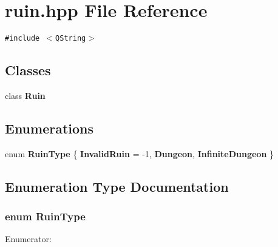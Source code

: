 \section{ruin.hpp File Reference}
\label{ruin_8hpp}
{\tt \#include $<$QString$>$}\par
\subsection*{Classes}
\begin{CompactItemize}
\item 
class {\bf Ruin}
\end{CompactItemize}
\subsection*{Enumerations}
\begin{CompactItemize}
\item 
enum {\bf Ruin\-Type} \{ {\bf Invalid\-Ruin} =  -1, 
{\bf Dungeon}, 
{\bf Infinite\-Dungeon}
 \}
\end{CompactItemize}


\subsection{Enumeration Type Documentation}
\subsubsection{\setlength{\rightskip}{0pt plus 5cm}enum {\bf Ruin\-Type}}\label{ruin_8hpp_a3}


\begin{Desc}
\item[Enumerator: ]\par
\begin{description}
\item[{\em 
Invalid\-Ruin\label{ruin_8hpp_a3a0}
}]\item[{\em 
Dungeon\label{ruin_8hpp_a3a1}
}]\item[{\em 
Infinite\-Dungeon\label{ruin_8hpp_a3a2}
}]\end{description}
\end{Desc}

